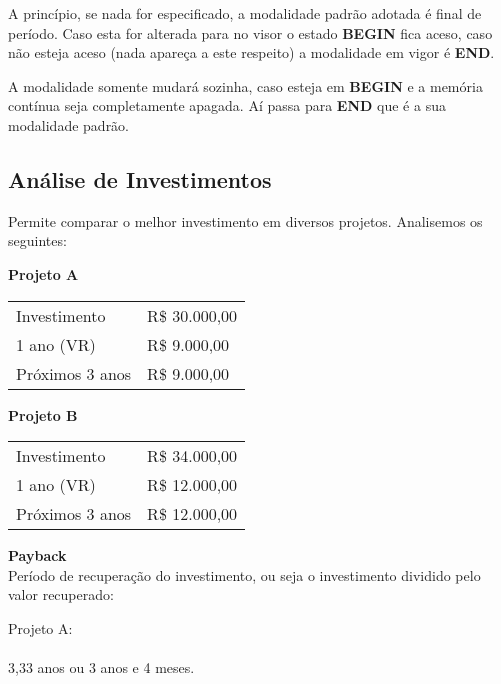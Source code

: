A princípio, se nada for especificado, a modalidade padrão adotada é final de período. Caso esta for alterada para  no visor o estado \textbf{BEGIN} fica aceso, caso não esteja aceso (nada apareça a este respeito) a modalidade em vigor é \textbf{END}. 

A modalidade somente mudará sozinha, caso esteja em \textbf{BEGIN} e a memória contínua seja completamente apagada. Aí passa para \textbf{END} que é a sua modalidade padrão.

\subsection*{Análise de Investimentos}
Permite comparar o melhor investimento em diversos projetos. Analisemos os seguintes:

\begin{minipage}[t]{.5\textwidth}
	\centering 
	\textbf{Projeto A}
	\begin{table}[H]
		\begin{tabular}{R{3cm} | R{2cm} }
			Investimento & R\$ 30.000,00 \\
			1 ano (VR) & R\$ 9.000,00 \\
			Próximos 3 anos & R\$ 9.000,00 \\
		\end{tabular}
	\end{table}
\end{minipage}%
\begin{minipage}[t]{.5\textwidth}
	\centering 
	\textbf{Projeto B}
	\begin{table}[H]
		\begin{tabular}{R{3cm} | R{2cm} }
			Investimento & R\$ 34.000,00 \\
			1 ano (VR) & R\$ 12.000,00 \\
			Próximos 3 anos & R\$ 12.000,00 \\
		\end{tabular}
	\end{table}
\end{minipage}

\textbf{Payback} \\
Período de recuperação do investimento, ou seja o investimento dividido pelo valor recuperado:

Projeto A: \\
          \keystroke{$\div$} \\
3,33 anos ou 3 anos e 4 meses.

